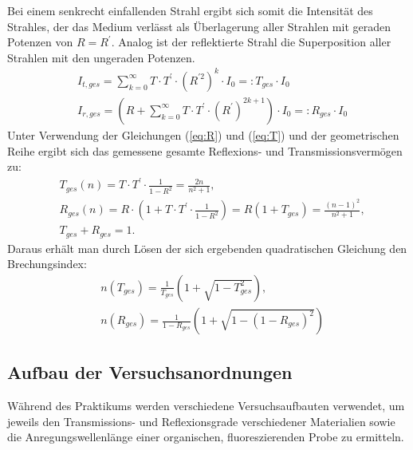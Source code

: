 	Bei einem senkrecht einfallenden Strahl ergibt sich somit die Intensität des Strahles, der das Medium verlässt als Überlagerung aller Strahlen mit geraden Potenzen von $R = R^\prime$. Analog ist der reflektierte Strahl die Superposition aller Strahlen mit den ungeraden Potenzen.
	\begin{align}
		&I_{t,ges} = \sum_{k = 0}^{\infty} T\cdot T^\prime \cdot (R^{\prime 2})^k \cdot I_0 =: T_{ges}\cdot I_0\\
		&I_{r,ges} = \left(R + \sum_{k = 0}^{\infty} T\cdot T^\prime \cdot (R^\prime)^{2k+1}\right) \cdot I_0 =: R_{ges}\cdot I_0
	\end{align}
	Unter Verwendung der Gleichungen (\ref{eq:R}) und (\ref{eq:T}) und der geometrischen Reihe ergibt sich das gemessene gesamte Reflexions- und Transmissionsvermögen zu:
	\begin{align}
			&T_{ges}(n) = T\cdot T^\prime \cdot \frac{1}{1 - R^2} = \frac{2n}{n^2 + 1},\\
			&R_{ges}(n) = R\cdot \left(1 + T\cdot T^\prime \cdot \frac{1}{1 - R^2}\right) = R (1 + T_{ges}) = \frac{(n-1)^2}{n^2+1},\\
			&T_{ges} + R_{ges} = 1.
	\end{align}
	Daraus erhält man durch Lösen der sich ergebenden quadratischen Gleichung den Brechungsindex:
	\begin{align}
		&n(T_{ges}) = \frac{1}{T_{ges}}\left(1 + \sqrt{1 - T_{ges}^2}\right), \label{eq:n_T}\\
		&n(R_{ges}) = \frac{1}{1 - R_{ges}}\left(1 + \sqrt{1 - (1 - R_{ges})^2}\right) \label{eq:n_R}
	\end{align}
\subsection{Aufbau der Versuchsanordnungen}
    Während des Praktikums werden verschiedene Versuchsaufbauten verwendet, um jeweils den Transmissions- und Reflexionsgrade verschiedener Materialien sowie die Anregungswellenlänge einer organischen, fluoreszierenden Probe zu ermitteln.

